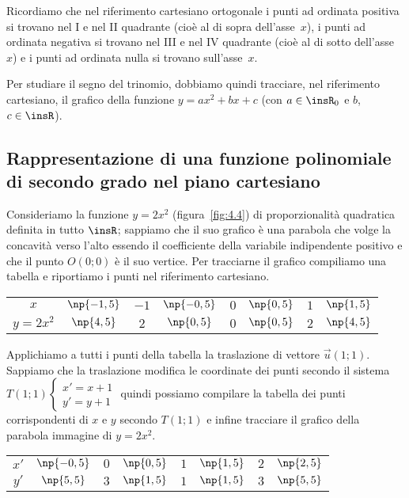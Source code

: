 Ricordiamo che nel riferimento cartesiano ortogonale i punti ad ordinata positiva si trovano nel I e nel II quadrante (cioè al di sopra dell'asse~$x$), i punti ad ordinata negativa si trovano nel III e nel IV quadrante (cioè al di sotto dell'asse~$x$) e i punti ad ordinata nulla si trovano sull'asse~$x$.

Per studiare il segno del trinomio, dobbiamo quindi tracciare, nel riferimento cartesiano, il grafico della funzione $y=ax^2+bx+c$ (con $a\in \insR_{0}$ e $b$, $c\in \insR$).

\subsection{Rappresentazione di una funzione polinomiale di secondo grado nel piano cartesiano}

Consideriamo la funzione $y=2x^2$ (figura~\ref{fig:4.4}) di proporzionalità quadratica definita in tutto $\insR$; sappiamo che il suo grafico è una parabola che volge la concavità verso l'alto essendo il coefficiente della variabile indipendente positivo e che il punto $O(0;0)$ è il suo vertice. Per tracciarne il grafico compiliamo una tabella e riportiamo i punti nel riferimento cartesiano.

\begin{center}
\begin{tabular} {*{8}{c}}
\toprule
$x$      & $\np{-1,5}$ & $-1$ & $\np{-0,5}$ & $0$ & $\np{0,5}$ & $1$ & $\np{1,5}$\\
$y=2x^2$ & $ \np{4,5}$ &  $2$ &  $\np{0,5}$ & $0$ & $\np{0,5}$ & $2$ & $\np{4,5}$\\
\bottomrule
\end{tabular}
\end{center}

Applichiamo a tutti i punti della tabella la traslazione di vettore $\vec u(1;1)$. Sappiamo che la traslazione modifica le coordinate dei punti secondo il sistema ${T}(1;1) \left\{\begin{array}{l}{x'=x+1}\\{y'=y+1}\end{array}\right.$ quindi possiamo compilare la tabella dei punti corrispondenti di $x$ e $y$ secondo $T(1;1)$ e infine tracciare il grafico della parabola immagine di $y=2x^2$.

\begin{center}
\begin{tabular} {*{8}{c}}
\toprule
$x'$ & $\np{-0,5}$ & $0$ & $\np{0,5}$ & $1$ & $\np{1,5}$ & $2$ & $\np{2,5}$\\
$y'$ & $\np{5,5}$  & $3$ & $\np{1,5}$ & $1$ & $\np{1,5}$ & $3$ & $\np{5,5}$\\
\bottomrule
\end{tabular}
\end{center}

